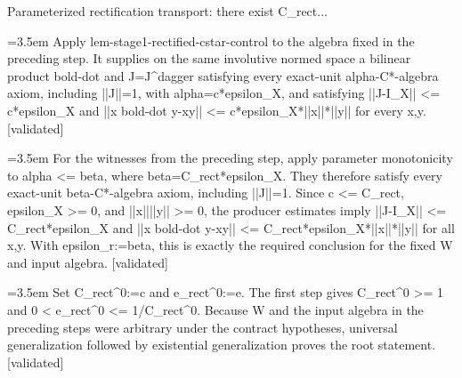 \documentclass{article}
\newcommand{\step}[1]{\par\noindent\hangindent=3.5em\hangafter=1%
  \makebox[3.5em][l]{\textbf{#1.}}}
\newcommand{\steptag}[1]{\hfill{\small\textsf{[#1]}}}
\begin{document}
\begin{proofbox}{Parameterized rectification transport: there exist C\_rect...}
\step{1.4} Apply lem-stage1-rectified-cstar-control to the algebra fixed in the preceding step. It supplies on the same involutive normed space a bilinear product bold-dot and J=J\textasciicircum{}dagger satisfying every exact-unit alpha-C*-algebra axiom, including ||J||=1, with alpha=c*epsilon\_X, and satisfying ||J-I\_X|| <= c*epsilon\_X and ||x bold-dot y-xy|| <= c*epsilon\_X*||x||*||y|| for every x,y. \steptag{validated} \\[4pt]
\step{1.5} For the witnesses from the preceding step, apply parameter monotonicity to alpha <= beta, where beta=C\_rect*epsilon\_X. They therefore satisfy every exact-unit beta-C*-algebra axiom, including ||J||=1. Since c <= C\_rect, epsilon\_X >= 0, and ||x||||y|| >= 0, the producer estimates imply ||J-I\_X|| <= C\_rect*epsilon\_X and ||x bold-dot y-xy|| <= C\_rect*epsilon\_X*||x||*||y|| for all x,y. With epsilon\_r:=beta, this is exactly the required conclusion for the fixed W and input algebra. \steptag{validated} \\[4pt]
\step{1.6} Set C\_rect\textasciicircum{}0:=c and e\_rect\textasciicircum{}0:=e. The first step gives C\_rect\textasciicircum{}0 >= 1 and 0 < e\_rect\textasciicircum{}0 <= 1/C\_rect\textasciicircum{}0. Because W and the input algebra in the preceding steps were arbitrary under the contract hypotheses, universal generalization followed by existential generalization proves the root statement. \steptag{validated} \\[4pt]
\end{proofbox}
\end{document}
